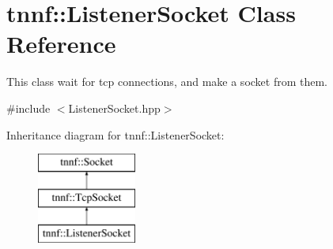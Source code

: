 \hypertarget{classtnnf_1_1_listener_socket}{}\section{tnnf\+:\+:Listener\+Socket Class Reference}
\label{classtnnf_1_1_listener_socket}


This class wait for tcp connections, and make a socket from them.  




{\ttfamily \#include $<$Listener\+Socket.\+hpp$>$}

Inheritance diagram for tnnf\+:\+:Listener\+Socket\+:\begin{figure}[H]
\begin{center}
\leavevmode
\includegraphics[height=3.000000cm]{classtnnf_1_1_listener_socket}
\end{center}
\end{figure}
